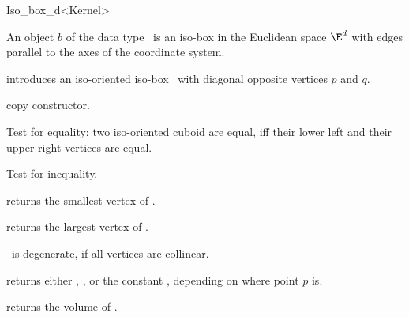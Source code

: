 \begin{ccRefClass} {Iso_box_d<Kernel>}

\ccDefinition  An object $b$ of the data type \ccRefName\ is an
iso-box in the Euclidean space $\E^d$ with edges parallel to the 
axes of the coordinate system.
 
\ccCreation
{}\ccTagFullDeclarations

            {introduces an iso-oriented iso-box \ccVar\ with diagonal
             opposite vertices $p$ and $q$. 
}

\ccHidden {}
            {copy constructor.}

\ccOperations

       {Test for equality: two iso-oriented cuboid are equal, iff their
        lower left and their upper right vertices are equal.}

       {Test for inequality.}

       {returns the smallest vertex of \ccVar.}


       {returns the largest vertex of \ccVar.}


\ccPredicates

       {%
        \ccVar\ is degenerate, if all vertices
        are collinear.}

       {returns either ,
        , or the constant
        , 
        depending on where point $p$ is.}

       {}
\ccGlue
{}
       {}
\ccGlue
{}
       {}


       {returns the volume of \ccVar. }

\end{ccRefClass} 
